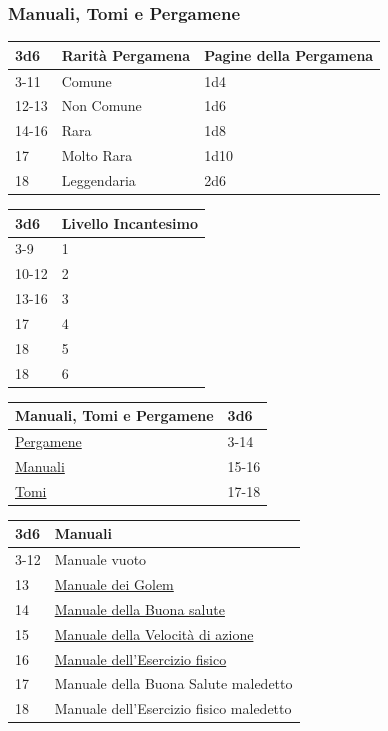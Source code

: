 \begin{multicols}{2}
{\subsubsection{Manuali, Tomi e Pergamene}\hypertarget{manualitomi}{}\label{manualitomi}\label{CPergamene}\hypertarget{CPergamene}{}

{\small \begin{tabularx}{0.48\textwidth}{lll}
		\toprule
\textbf{3d6} & \textbf{Rarità Pergamena} & \textbf{Pagine della Pergamena}\\
\toprule
3-11 &Comune & 1d4 \\
12-13 &Non Comune & 1d6 \\
14-16 &Rara & 1d8 \\
17 & Molto Rara & 1d10\\
18 & Leggendaria & 2d6\\
\end{tabularx}}

\medskip

{\small \begin{tabularx}{0.48\textwidth}{ll}
		\toprule
	\textbf{3d6} & \textbf{Livello Incantesimo}\\
	\toprule
	3-9 & 1 \\
	10-12 & 2 \\
	13-16 & 3  \\
	17 & 4  \\
	18 & 5 \\
	18 & 6 \\
\end{tabularx}}

\medskip

{\small\begin{tabularx}{0.45\textwidth}{lX}
		\toprule
		\textbf{Manuali, Tomi e Pergamene}&\textbf{3d6}\\
		\toprule
		\hyperlink{manualitomi}{Pergamene} &3-14\\
		\hyperlink{manualitomi}{Manuali} &15-16\\
		\hyperlink{manualitomi}{Tomi} &17-18
\end{tabularx}}

\medskip\hypertarget{Manuali}{}

\noindent\begin{tabularx}{0.45\textwidth}{lX}
	\toprule
\textbf{3d6} & \textbf{Manuali}\\
\toprule
3-12 & Manuale vuoto\\
13 & \hyperlink{ManualedeiGolem}{Manuale dei Golem}\\
14 & \hyperlink{ManualedellaBuonasalute}{Manuale della Buona salute}\\
15 & \hyperlink{ManualedellaVelocitàdiazione}{Manuale della Velocità di azione}\\
16 & \hyperlink{Manualedell'Eserciziofisico}{Manuale dell'Esercizio fisico}\\
17 & Manuale della Buona Salute maledetto\\
18 & Manuale dell'Esercizio fisico maledetto
\end{tabularx}

}
\end{multicols}

